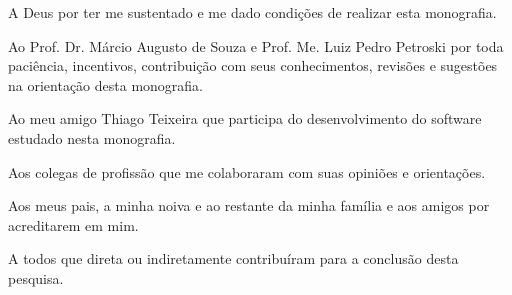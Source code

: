 
\begin{agradecimentos}[AGRADECIMENTOS]

A Deus por ter me sustentado e me dado condições de realizar esta monografia.

Ao Prof. Dr. Márcio Augusto de Souza e Prof. Me. Luiz Pedro Petroski por toda paciência, incentivos, contribuição com seus conhecimentos, revisões e sugestões na orientação desta monografia.

Ao meu amigo Thiago Teixeira que participa do desenvolvimento do software estudado nesta monografia.

Aos colegas de profissão que me colaboraram com suas opiniões e orientações.

Aos meus pais, a minha noiva e ao restante da minha família e aos amigos por acreditarem em mim.

A todos que direta ou indiretamente contribuíram para a conclusão desta pesquisa.


\end{agradecimentos}
